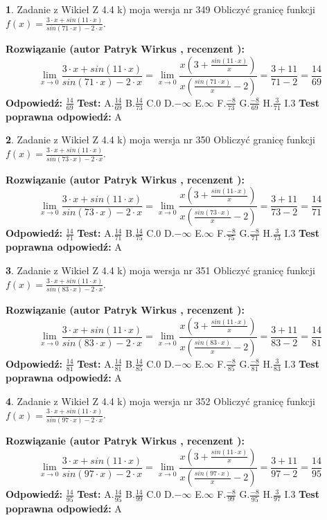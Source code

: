 \documentclass[12pt, a4paper]{article}
\theoremstyle{definition} %
\newtheorem{zad}{}
\newcommand{\zadStart}[1]{\begin{zad}#1\newline}
\newcommand{\zadStop}{\end{zad}}
\newcommand{\rozwStart}[2]{\noindent \textbf{Rozwiązanie (autor #1 , recenzent #2): }\newline}
\newcommand{\rozwStop}{\newline}
\newcommand{\odpStart}{\noindent \textbf{Odpowiedź:}\newline}
\newcommand{\odpStop}{\newline}
\newcommand{\testStart}{\noindent \textbf{Test:}\newline}
\newcommand{\testStop}{\newline}
\newcommand{\kluczStart}{\noindent \textbf{Test poprawna odpowiedź:}\newline}
\newcommand{\kluczStop}{\newline}
\begin{document}
\zadStart{Zadanie z Wikieł Z 4.4 k) moja wersja nr 349}
Obliczyć granicę funkcji $f(x)=\frac{3\cdot x +sin(11\cdot x)}{sin(71\cdot x) -2\cdot x}$.
\zadStop
\rozwStart{Patryk Wirkus}{}
$$\lim\limits_{x\to 0}\frac{3\cdot x +sin(11\cdot x)}{sin(71\cdot x) -2\cdot x}
=\lim\limits_{x\to 0}\frac{x(3+\frac{sin(11\cdot x)}{x})}{x(\frac{sin(71\cdot x)}{x}-2)}
=\frac{3+11}{71-2} = \frac{14}{69}$$
\rozwStop
\odpStart
$\frac{14}{69}$
\odpStop
\testStart
A.$\frac{14}{69}$
B.$\frac{14}{73}$
C.$0$
D.$-\infty$
E.$\infty$
F.$\frac{-8}{73}$
G.$\frac{-8}{69}$
H.$\frac{3}{71}$
I.$3$
\testStop
\kluczStart
A
\kluczStop



\zadStart{Zadanie z Wikieł Z 4.4 k) moja wersja nr 350}
Obliczyć granicę funkcji $f(x)=\frac{3\cdot x +sin(11\cdot x)}{sin(73\cdot x) -2\cdot x}$.
\zadStop
\rozwStart{Patryk Wirkus}{}
$$\lim\limits_{x\to 0}\frac{3\cdot x +sin(11\cdot x)}{sin(73\cdot x) -2\cdot x}
=\lim\limits_{x\to 0}\frac{x(3+\frac{sin(11\cdot x)}{x})}{x(\frac{sin(73\cdot x)}{x}-2)}
=\frac{3+11}{73-2} = \frac{14}{71}$$
\rozwStop
\odpStart
$\frac{14}{71}$
\odpStop
\testStart
A.$\frac{14}{71}$
B.$\frac{14}{75}$
C.$0$
D.$-\infty$
E.$\infty$
F.$\frac{-8}{75}$
G.$\frac{-8}{71}$
H.$\frac{3}{73}$
I.$3$
\testStop
\kluczStart
A
\kluczStop



\zadStart{Zadanie z Wikieł Z 4.4 k) moja wersja nr 351}
Obliczyć granicę funkcji $f(x)=\frac{3\cdot x +sin(11\cdot x)}{sin(83\cdot x) -2\cdot x}$.
\zadStop
\rozwStart{Patryk Wirkus}{}
$$\lim\limits_{x\to 0}\frac{3\cdot x +sin(11\cdot x)}{sin(83\cdot x) -2\cdot x}
=\lim\limits_{x\to 0}\frac{x(3+\frac{sin(11\cdot x)}{x})}{x(\frac{sin(83\cdot x)}{x}-2)}
=\frac{3+11}{83-2} = \frac{14}{81}$$
\rozwStop
\odpStart
$\frac{14}{81}$
\odpStop
\testStart
A.$\frac{14}{81}$
B.$\frac{14}{85}$
C.$0$
D.$-\infty$
E.$\infty$
F.$\frac{-8}{85}$
G.$\frac{-8}{81}$
H.$\frac{3}{83}$
I.$3$
\testStop
\kluczStart
A
\kluczStop



\zadStart{Zadanie z Wikieł Z 4.4 k) moja wersja nr 352}
Obliczyć granicę funkcji $f(x)=\frac{3\cdot x +sin(11\cdot x)}{sin(97\cdot x) -2\cdot x}$.
\zadStop
\rozwStart{Patryk Wirkus}{}
$$\lim\limits_{x\to 0}\frac{3\cdot x +sin(11\cdot x)}{sin(97\cdot x) -2\cdot x}
=\lim\limits_{x\to 0}\frac{x(3+\frac{sin(11\cdot x)}{x})}{x(\frac{sin(97\cdot x)}{x}-2)}
=\frac{3+11}{97-2} = \frac{14}{95}$$
\rozwStop
\odpStart
$\frac{14}{95}$
\odpStop
\testStart
A.$\frac{14}{95}$
B.$\frac{14}{99}$
C.$0$
D.$-\infty$
E.$\infty$
F.$\frac{-8}{99}$
G.$\frac{-8}{95}$
H.$\frac{3}{97}$
I.$3$
\testStop
\kluczStart
A
\kluczStop
\end{document}
